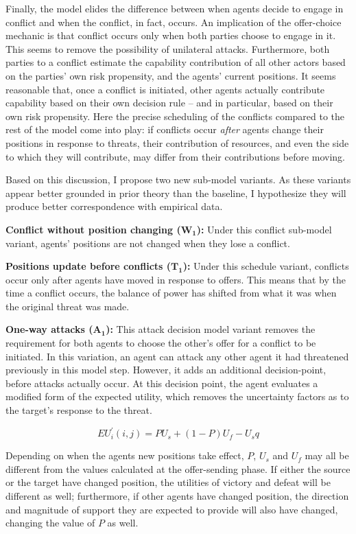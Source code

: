 Finally, the model elides the difference between when agents decide to engage in conflict and when the conflict, in fact, occurs. An implication of the offer-choice mechanic is that conflict occurs only when both parties choose to engage in it. This seems to remove the possibility of unilateral attacks. Furthermore, both parties to a conflict estimate the capability contribution of all other actors based on the parties' own risk propensity, and the agents' current positions. It seems reasonable that, once a conflict is initiated, other agents actually contribute capability based on their own decision rule -- and in particular, based on their own risk propensity. Here the precise scheduling of the conflicts compared to the rest of the model come into play: if conflicts occur \emph{after} agents change their positions in response to threats, their contribution of resources, and even the side to which they will contribute, may differ from their contributions before moving.

Based on this discussion, I propose two new sub-model variants. As these variants appear better grounded in prior theory than the baseline, I hypothesize they will produce better correspondence with empirical data.

\textbf{Conflict without position changing ($\mathbf{W_1}$):} Under this conflict sub-model variant, agents' positions are not changed when they lose a conflict. 

\textbf{Positions update before conflicts ($\mathbf{T_1}$):} Under this schedule variant, conflicts occur only after agents have moved in response to offers. This means that by the time a conflict occurs, the balance of power has shifted from what it was when the original threat was made.

\textbf{One-way attacks ($\mathbf{A_1}$):} This attack decision model variant removes the requirement for both agents to choose the other's offer for a conflict to be initiated. In this variation, an agent can attack any other agent it had threatened previously in this model step. However, it adds an additional decision-point, before attacks actually occur. At this decision point, the agent evaluates a modified form of the expected utility, which removes the uncertainty factors as to the target's response to the threat.

\begin{equation}
    EU_i^\prime(i,j) = P U_s + (1-P)U_f - U_sq
\end{equation}

Depending on when the agents new positions take effect, $P$, $U_s$ and $U_f$ may all be different from the values calculated at the offer-sending phase. If either the source or the target have changed position, the utilities of victory and defeat will be different as well; furthermore, if other agents have changed position, the direction and magnitude of support they are expected to provide will also have changed, changing the value of $P$ as well.

